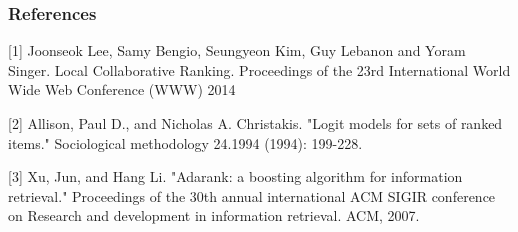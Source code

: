 \subsubsection*{References}
\label{sec:references}

\small{
[1] Joonseok Lee, Samy Bengio, Seungyeon Kim, Guy Lebanon and Yoram Singer. Local Collaborative Ranking. Proceedings of the 23rd International World Wide Web Conference (WWW) 2014

[2] Allison, Paul D., and Nicholas A. Christakis. "Logit models for sets of ranked items." Sociological methodology 24.1994 (1994): 199-228.

[3] Xu, Jun, and Hang Li. "Adarank: a boosting algorithm for information retrieval." Proceedings of the 30th annual international ACM SIGIR conference on Research and development in information retrieval. ACM, 2007.
}
